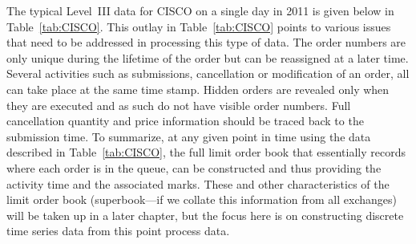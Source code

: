 The typical Level~III data for CISCO on a single day in 2011 is given below in Table~\ref{tab:CISCO}. This outlay in Table~\ref{tab:CISCO} points to various issues that need to be addressed in processing this type of data. The order numbers are only unique during the lifetime of the order but can be reassigned at a later time. Several activities such as submissions, cancellation or modification of an order, all can take place at the same time stamp. Hidden orders are revealed only when they are executed and as such do not have visible order numbers.\label{in:hidden1} Full cancellation quantity and price information should be traced back to the submission time. To summarize, at any given point in time using the data described in Table~\ref{tab:CISCO}, the full limit order book that essentially records where each order is in the queue, can be constructed and thus providing the activity time and the associated marks. These and other characteristics of the limit order book (superbook---if we collate this information from all exchanges) will be taken up in a later chapter, but the focus here is on constructing discrete time series data from this point process data. 
